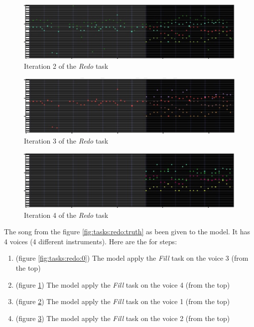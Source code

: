 \documentclass[12pt]{report}
\begin{document}
\begin{figure}[htbp]
    \centering
    \includegraphics[width=\textwidth]{images/generated_midis/tasks/redo/task-redo-1.jpg}
    \caption{Iteration 2 of the \textit{Redo} task}
    \label{fig:tasks:redo:1}
\end{figure}

\begin{figure}[htbp]
    \centering
    \includegraphics[width=\textwidth]{images/generated_midis/tasks/redo/task-redo-2.jpg}
    \caption{Iteration 3 of the \textit{Redo} task}
    \label{fig:tasks:redo:2}
\end{figure}

\begin{figure}[htbp]
    \centering
    \includegraphics[width=\textwidth]{images/generated_midis/tasks/redo/task-redo-3.jpg}
    \caption{Iteration 4 of the \textit{Redo} task}
    \label{fig:tasks:redo:3}
\end{figure}

The song from the figure \ref{fig:tasks:redo:truth} as been given to the model.
It has 4 voices (4 different instruments).
Here are the for steps:
\begin{enumerate}
    \item (figure \ref{fig:tasks:redo:0}) The model apply the \textit{Fill} task on the voice 3 (from the top)
    \item (figure \ref{fig:tasks:redo:1}) The model apply the \textit{Fill} task on the voice 4 (from the top)
    \item (figure \ref{fig:tasks:redo:2}) The model apply the \textit{Fill} task on the voice 1 (from the top)
    \item (figure \ref{fig:tasks:redo:3}) The model apply the \textit{Fill} task on the voice 2 (from the top)
\end{enumerate}
\end{document}
